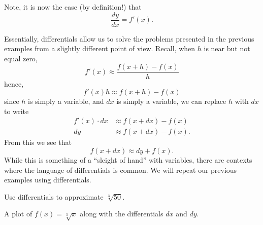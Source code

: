 Note, it is now the case (by definition!) that 
\[
\frac{dy}{dx} = f'(x).
\]

Essentially, differentials allow us to solve the problems presented in
the previous examples from a slightly different point of view. Recall,
when $h$ is near but not equal zero,
\[
f'(x) \approx \frac{f(x+h)-f(x)}{h}
\]
hence, 
\[
f'(x)h \approx f(x+h)-f(x)
\]
since $h$ is simply a variable, and $dx$ is simply a variable, we can replace $h$ with $dx$ to write
\begin{align*}
f'(x)\cdot dx &\approx f(x+dx)-f(x)\\
dy &\approx f(x+dx)-f(x).
\end{align*}
From this we see that 
\[
f(x+dx)\approx dy + f(x).
\]
While this is something of a ``sleight of hand'' with variables, there
are contexts where the language of differentials is common. We will
repeat our previous examples using differentials.

\begin{example}
Use differentials to approximate $\sqrt[3]{50}$.
\end{example}

\begin{marginfigure}
\caption{A plot of $f(x) = \sqrt[3]{x}$  along with the differentials $dx$ and
  $dy$.}
\label{figure:diff sqrt3x}
\end{marginfigure}


